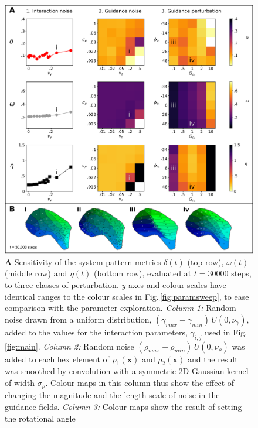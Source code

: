 \documentclass[9pt,lineno]{elife}
\newcommand{\MPthreeSens}[1]{\textcolor{revgblack}{#1}}
\newcommand{\mb}[1]{\mathbf{#1}}
\begin{document}
\begin{figure}
  \begin{fullwidth}
    \includegraphics[width=\linewidth]{./Fig3.png}
    \caption{
      \MPthreeSens{\textbf{A} Sensitivity of the system pattern
        metrics $\delta(t)$ (top row), $\omega(t)$ (middle row) and $\eta(t)$
        (bottom row), evaluated at $t=30000$ steps,
        to three classes of perturbation. $y$-axes and colour scales have identical ranges
        to the colour scales in Fig.\,\ref{fig:paramsweep}, to ease comparison
        with the parameter exploration.
        \emph{Column 1:} Random noise drawn from a uniform distribution,
        $(\gamma_{max}-\gamma_{min})\,U(0,\nu_\gamma)$, added
        to the values for the interaction parameters, $\gamma_{i,j}$ used in
        Fig.\,\ref{fig:main}.
        \emph{Column 2:} Random noise $(\rho_{max} - \rho_{min})\,U(0, \nu_{\rho})$
        was added to each hex element of $\rho_1(\mb{x})$ and $\rho_2(\mb{x})$ and the result
        was smoothed by convolution with a symmetric 2D
        Gaussian kernel of width $\sigma_\rho$. Colour maps in this column
        thus show the effect of changing the magnitude and the length scale of
        noise in the guidance fields.
        \emph{Column 3:} Colour maps show the result of setting the rotational angle
}}
\end{fullwidth}
\end{figure}
\end{document}
